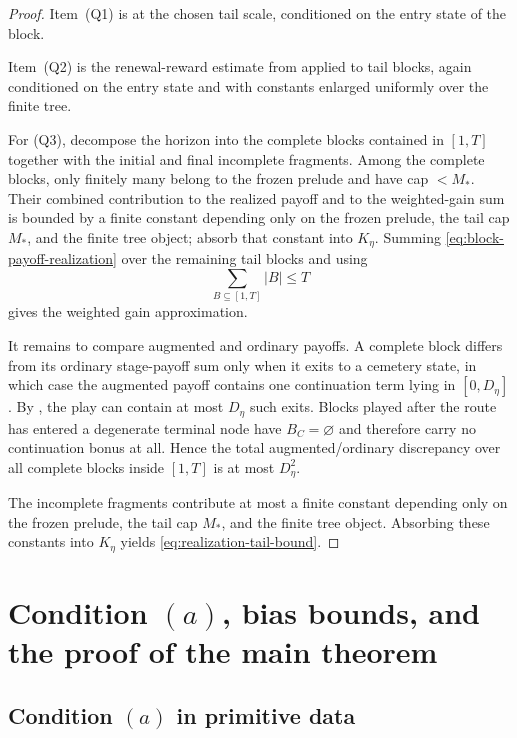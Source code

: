 \documentclass[12pt]{article}
\theoremstyle{definition}
\newcommand{\1}{\mathbf{1}}
\begin{document}
\begin{proof}
Item~(Q1) is  at the chosen tail scale, conditioned on
the entry state of the block.

Item~(Q2) is the renewal-reward estimate from 
applied to tail blocks, again conditioned on the entry state and with constants
enlarged uniformly over the finite tree.

For (Q3), decompose the horizon into the complete blocks contained in $[1,T]$
together with the initial and final incomplete fragments. Among the complete
blocks, only finitely many belong to the frozen prelude and have cap $<M_*$.
Their combined contribution to the realized payoff and to the weighted-gain sum
is bounded by a finite constant depending only on the frozen prelude, the tail
cap $M_*$, and the finite tree object; absorb that constant into $K_\eta$.
Summing \eqref{eq:block-payoff-realization} over the remaining tail blocks and
using
\[
\sum_{B\subseteq [1,T]} |B|\le T
\]
gives the weighted gain approximation.

It remains to compare augmented and ordinary payoffs. A complete block differs
from its ordinary stage-payoff sum only when it exits to a cemetery state, in
which case the augmented payoff contains one continuation term lying in
$[0,D_\eta]$. By , the play can contain at most $D_\eta$
such exits. Blocks played after the route has entered a degenerate terminal node
have $B_C=\varnothing$ and therefore carry no continuation bonus at all. Hence
the total augmented/ordinary discrepancy over all complete blocks inside $[1,T]$
is at most $D_\eta^2$.

The incomplete fragments contribute at most a finite constant depending only on
the frozen prelude, the tail cap $M_*$, and the finite tree object. Absorbing
these constants into $K_\eta$ yields \eqref{eq:realization-tail-bound}.
\end{proof}

\section{Condition \texorpdfstring{$(a)$}{(a)}, bias bounds, and the proof of the main theorem}
\label{sec:proof-main}

\subsection{Condition \texorpdfstring{$(a)$}{(a)} in primitive data}
\end{document}
